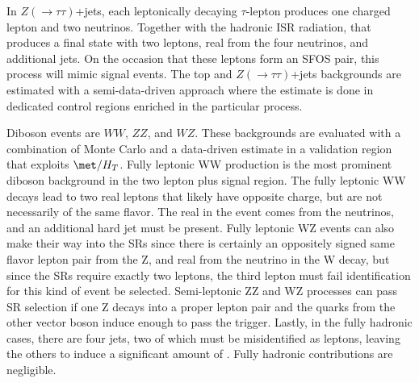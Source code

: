 In $Z(\rightarrow\tau\tau)$+jets, each leptonically decaying $\tau$-lepton produces one charged lepton and two neutrinos.  Together with the hadronic ISR radiation, that produces a final state with two leptons, real \met from the four neutrinos, and additional jets.  On the occasion that these leptons form an SFOS pair, this process will mimic signal events.  The top and $Z(\rightarrow\tau\tau)$+jets backgrounds are estimated with a semi-data-driven approach where the estimate is done in dedicated control regions enriched in the particular process.

Diboson events are $WW$, $ZZ$, and $WZ$.   These backgrounds are evaluated with a combination of Monte Carlo and a data-driven estimate in a validation region that exploits $\met/H_T$.  Fully leptonic WW production is the most prominent diboson background in the two lepton plus \met signal region.  The fully leptonic WW decays lead to two real leptons that likely have opposite charge, but are not necessarily of the same flavor.  The real \met in the event comes from the neutrinos, and an additional hard jet must be present.  Fully leptonic WZ events can also make their way into the SRs since there is certainly an oppositely signed same flavor lepton pair from the Z, and real \met from the neutrino in the W decay, but since the SRs require exactly two leptons, the third lepton must fail identification for this kind of event be selected.  Semi-leptonic ZZ and WZ processes can pass SR selection if one Z decays into a proper lepton pair and the quarks from the other vector boson induce enough \met to pass the \met trigger.  Lastly, in the fully hadronic cases, there are four jets, two of which must be misidentified as leptons, leaving the others to induce a significant amount of \met.  Fully hadronic contributions are negligible.    

